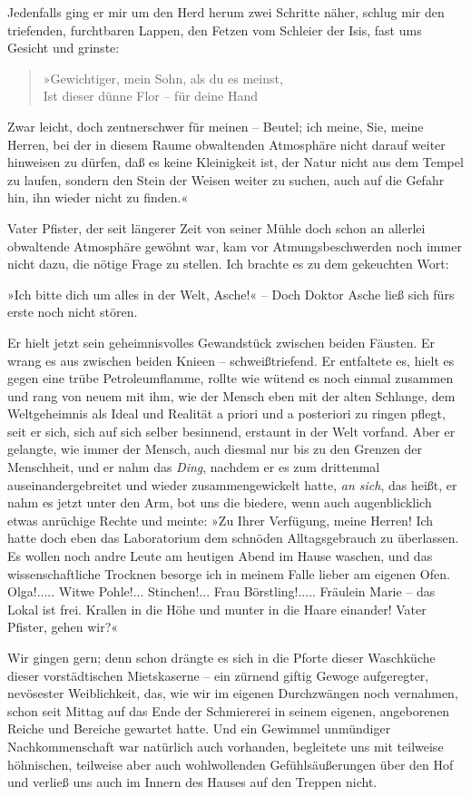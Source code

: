 Jedenfalls ging er mir um den Herd herum zwei Schritte näher,
schlug mir den triefenden, furchtbaren Lappen, den Fetzen vom
Schleier der Isis, fast ums Gesicht und grinste:

\begin{verse}
»Gewichtiger, mein Sohn, als du es meinst,\\
Ist dieser dünne Flor – für deine Hand
\end{verse}

Zwar leicht, doch zentnerschwer für meinen – Beutel; ich meine,
Sie, meine Herren, bei der in diesem Raume obwaltenden Atmosphäre
nicht darauf weiter hinweisen zu dürfen, daß es keine Kleinigkeit
ist, der Natur nicht aus dem Tempel zu laufen, sondern den Stein
der Weisen weiter zu suchen, auch auf die Gefahr hin, ihn wieder
nicht zu finden.«

Vater Pfister, der seit längerer Zeit von seiner Mühle doch schon
an allerlei obwaltende Atmosphäre gewöhnt war, kam vor
Atmungsbeschwerden noch immer nicht dazu, die nötige Frage zu
stellen. Ich brachte es zu dem gekeuchten Wort:

»Ich bitte dich um alles in der Welt, Asche!« – Doch Doktor Asche
ließ sich fürs erste noch nicht stören.

Er hielt jetzt sein geheimnisvolles Gewandstück zwischen beiden
Fäusten. Er wrang es aus zwischen beiden Knieen – schweißtriefend.
Er entfaltete es, hielt es gegen eine trübe Petroleumflamme, rollte
wie wütend es noch einmal zusammen und rang von neuem mit ihm, wie
der Mensch eben mit der alten Schlange, dem Weltgeheimnis als Ideal
und Realität a priori und a posteriori zu ringen pflegt, seit er
sich, sich auf sich selber besinnend, erstaunt in der Welt vorfand.
Aber er gelangte, wie immer der Mensch, auch diesmal nur bis zu den
Grenzen der Menschheit, und er nahm das \emph{Ding}, nachdem er es
zum drittenmal auseinandergebreitet und wieder zusammengewickelt
hatte, \emph{an sich}, das heißt, er nahm es jetzt unter den Arm,
bot uns die biedere, wenn auch augenblicklich etwas anrüchige
Rechte und meinte: »Zu Ihrer Verfügung, meine Herren! Ich hatte
doch eben das Laboratorium dem schnöden Alltagsgebrauch zu
überlassen. Es wollen noch andre Leute am heutigen Abend im Hause
waschen, und das wissenschaftliche Trocknen besorge ich in meinem
Falle lieber am eigenen Ofen. Olga!..... Witwe Pohle!...
Stinchen!... Frau Börstling!..... Fräulein Marie – das Lokal ist
frei. Krallen in die Höhe und munter in die Haare einander! Vater
Pfister, gehen wir?«

Wir gingen gern; denn schon drängte es sich in die Pforte dieser
Waschküche dieser vorstädtischen Mietskaserne – ein zürnend giftig
Gewoge aufgeregter, nevösester Weiblichkeit, das, wie wir im
eigenen Durchzwängen noch vernahmen, schon seit Mittag auf das Ende
der Schmiererei in seinem eigenen, angeborenen Reiche und Bereiche
gewartet hatte. Und ein Gewimmel unmündiger Nachkommenschaft war
natürlich auch vorhanden, begleitete uns mit teilweise höhnischen,
teilweise aber auch wohlwollenden Gefühlsäußerungen über den Hof
und verließ uns auch im Innern des Hauses auf den Treppen nicht.

